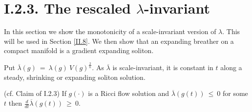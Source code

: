 \section{I.2.3. The rescaled $\lambda$-invariant}

In this section we show the monotonicity of a scale-invariant
version of $\lambda$.  This will be used in Section \ref{II.8}.
We then show that an expanding breather on a compact manifold
is a gradient expanding soliton.

Put $\overline{\lambda}(g) \: = \: \lambda(g) \: V(g)^{\frac{2}{n}}$.
As $\overline{\lambda}$ is scale-invariant, it is constant in $t$
along a steady, shrinking or expanding soliton solution.

\begin{proposition}
  \label{prop:kl-rescaled-invariant-monotonicity-rescaled-lambda-invariant}
 \label{expandingprop}  (cf. Claim of I.2.3)
If $g(\cdot)$ is a Ricci flow solution and
$\overline{\lambda}(g(t)) \: \le \: 0$ for some $t$ then
$\frac{d}{dt} \overline{\lambda}(g(t)) \: \ge \: 0$.
\end{proposition}
